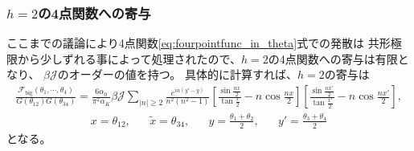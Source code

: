 \subsubsection{$h = 2$の4点関数への寄与}
ここまでの議論により4点関数\eqref{eq:fourpointfunc_in_theta}式での発散は
共形極限から少しずれる事によって処理されたので、$h=2$の4点関数への寄与は有限となり、
$\beta\mathcal{J}$のオーダーの値を持つ。
具体的に計算すれば、$h=2$の寄与は
\begin{align}
	\frac{\mathcal{F}_{\mathrm{big}}(\theta_1,\cdots,\theta_4)}{G(\theta_{12})G(\theta_{34})}
	= \frac{6\alpha_0}{\pi^2\alpha_K}\beta\mathcal{J}\sum_{|n|\geq 2}
		\frac{e^{in(y' - y)}}{n^2(n^2 - 1)}
		\left[
			\frac{\sin\frac{nx}{2}}{\tan\frac{x}{2}} - n\cos\frac{nx}{2}
		\right]
		\left[
			\frac{\sin\frac{nx'}{2}}{\tan\frac{x'}{2}} - n\cos\frac{nx'}{2}
		\right],
\end{align}
\begin{align}
	x = \theta_{12},\hspace{20pt}
	\tilde{x} = \theta_{34},\hspace{20pt}
	y = \frac{\theta_1 + \theta_2}{2},\hspace{20pt}
	y' = \frac{\theta_3 + \theta_4}{2}
\end{align}
となる。


\pagebreak
